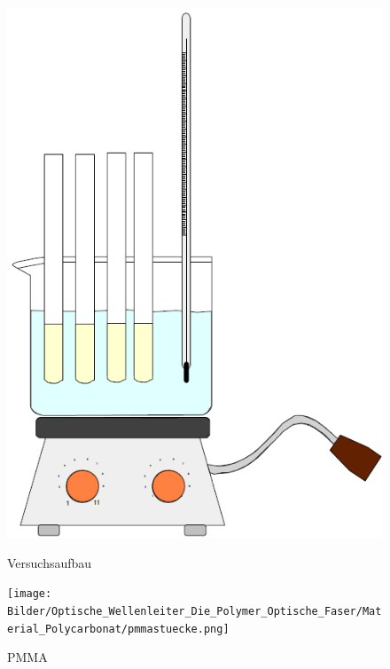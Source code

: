 \begin{figure}[h]
    \begin{center}
        \begin{minipage}[t]{0.4\textwidth}
            \begin{center}
                \includegraphics[height=0.1\textheight]{Bilder/Optische_Wellenleiter_Die_Polymer_Optische_Faser/Material_Polycarbonat/mmawasserbad.png}
                \caption[Versuchsaufbau]{Versuchsaufbau}
                \label{fig:mmawasserbad}
            \end{center}
        \end{minipage}
        \hspace{0.025\textwidth}
        \begin{minipage}[t]{0.4\textwidth}
            \begin{center}
                \texttt{[image: Bilder/Optische\_Wellenleiter\_Die\_Polymer\_Optische\_Faser/Material\_Polycarbonat/pmmastuecke.png]}
                \caption[PMMA]{PMMA}
                \label{fig:cdquillt}
            \end{center}
        \end{minipage}
    \end{center}
\end{figure}

